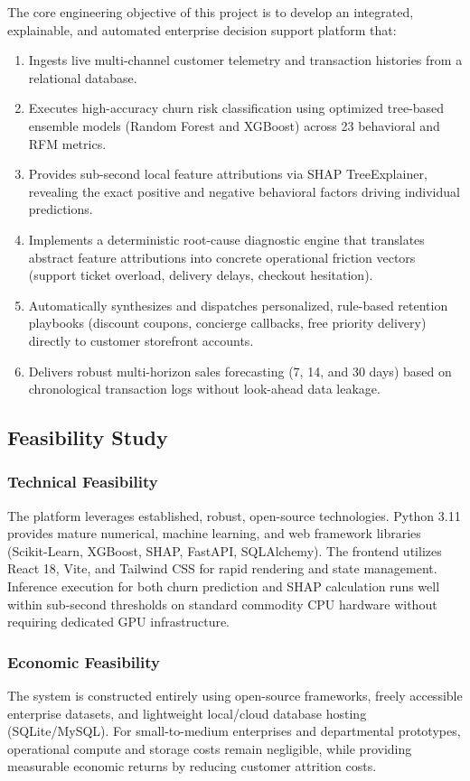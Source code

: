 \documentclass[12pt,a4paper]{article}
\begin{document}
The core engineering objective of this project is to develop an integrated, explainable, and automated enterprise decision support platform that:
\begin{enumerate}[leftmargin=20pt]
    \item Ingests live multi-channel customer telemetry and transaction histories from a relational database.
    \item Executes high-accuracy churn risk classification using optimized tree-based ensemble models (Random Forest and XGBoost) across 23 behavioral and RFM metrics.
    \item Provides sub-second local feature attributions via SHAP TreeExplainer, revealing the exact positive and negative behavioral factors driving individual predictions.
    \item Implements a deterministic root-cause diagnostic engine that translates abstract feature attributions into concrete operational friction vectors (support ticket overload, delivery delays, checkout hesitation).
    \item Automatically synthesizes and dispatches personalized, rule-based retention playbooks (discount coupons, concierge callbacks, free priority delivery) directly to customer storefront accounts.
    \item Delivers robust multi-horizon sales forecasting (7, 14, and 30 days) based on chronological transaction logs without look-ahead data leakage.
\end{enumerate}

\subsection{Feasibility Study}\label{sub:2.3}

\subsubsection{Technical Feasibility}
The platform leverages established, robust, open-source technologies. Python 3.11 provides mature numerical, machine learning, and web framework libraries (Scikit-Learn, XGBoost, SHAP, FastAPI, SQLAlchemy). The frontend utilizes React 18, Vite, and Tailwind CSS for rapid rendering and state management. Inference execution for both churn prediction and SHAP calculation runs well within sub-second thresholds on standard commodity CPU hardware without requiring dedicated GPU infrastructure.

\subsubsection{Economic Feasibility}
The system is constructed entirely using open-source frameworks, freely accessible enterprise datasets, and lightweight local/cloud database hosting (SQLite/MySQL). For small-to-medium enterprises and departmental prototypes, operational compute and storage costs remain negligible, while providing measurable economic returns by reducing customer attrition costs.
\end{document}
